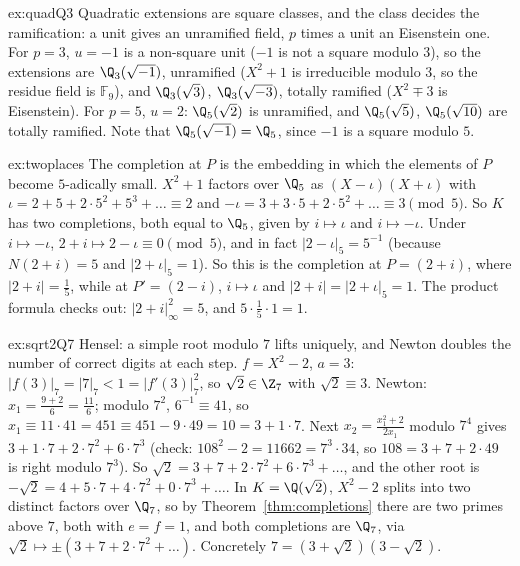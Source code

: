 \begin{solution}{ex:quadQ3}
\idea Quadratic extensions are square classes, and the class decides the ramification: a unit gives an unramified field,
$p$ times a unit an Eisenstein one.
\writeup For $p=3$, $u=-1$ is a non-square unit ($-1$ is not a square modulo $3$), so the extensions are $\Q_3(\sqrt{-1})$,
unramified ($X^2+1$ is irreducible modulo $3$, so the residue field is $\mathbb F_9$), and $\Q_3(\sqrt3)$, $\Q_3(\sqrt{-3})$, totally
ramified ($X^2\mp3$ is Eisenstein). For $p=5$, $u=2$: $\Q_5(\sqrt2)$ is unramified, and $\Q_5(\sqrt5)$, $\Q_5(\sqrt{10})$ are totally
ramified. Note that $\Q_5(\sqrt{-1})=\Q_5$, since $-1$ is a square modulo $5$.
\end{solution}

\begin{solution}{ex:twoplaces}
\idea The completion at $P$ is the embedding in which the elements of $P$ become $5$-adically small.
\writeup $X^2+1$ factors over $\Q_5$ as $(X-\iota)(X+\iota)$ with $\iota=2+5+2\cdot5^2+5^3+\dots\equiv2$ and
$-\iota=3+3\cdot5+2\cdot5^2+\dots\equiv3\pmod5$. So $K$ has two completions, both equal to $\Q_5$, given by $i\mapsto\iota$ and $i\mapsto
-\iota$. Under $i\mapsto-\iota$, $2+i\mapsto2-\iota\equiv0\pmod 5$, and in fact $|2-\iota|_5=5^{-1}$ (because $N(2+i)=5$ and
$|2+\iota|_5=1$). So this is the completion at $P=(2+i)$, where $|2+i|=\frac15$, while at $P'=(2-i)$, $i\mapsto\iota$ and
$|2+i|=|2+\iota|_5=1$. The product formula checks out: $|2+i|_\infty^2=5$, and $5\cdot\frac15\cdot1=1$.
\end{solution}

\begin{solution}{ex:sqrt2Q7}
\idea Hensel: a simple root modulo $7$ lifts uniquely, and Newton doubles the number of correct digits at each step.
\writeup $f=X^2-2$, $a=3$: $|f(3)|_7=|7|_7<1=|f'(3)|_7^2$, so $\sqrt2\in\Z_7$ with $\sqrt2\equiv3$. Newton: $x_1=\frac{9+2}{6}=\frac{11}6$;
modulo $7^2$, $6^{-1}\equiv41$, so $x_1\equiv11\cdot41=451\equiv451-9\cdot49=10=3+1\cdot7$. Next $x_2=\frac{x_1^2+2}{2x_1}$ modulo
$7^4$ gives $3+1\cdot7+2\cdot7^2+6\cdot7^3$ (check: $108^2-2=11662=7^3\cdot34$, so $108=3+7+2\cdot49$ is right modulo $7^3$). So
$\sqrt2=3+7+2\cdot7^2+6\cdot7^3+\dots$, and the other root is $-\sqrt2=4+5\cdot7+4\cdot7^2+0\cdot7^3+\dots$. In $K=\Q(\sqrt2)$,
$X^2-2$ splits into two distinct factors over $\Q_7$, so by Theorem~\ref{thm:completions} there are two primes above $7$, both
with $e=f=1$, and both completions are $\Q_7$, via $\sqrt2\mapsto\pm(3+7+2\cdot7^2+\dots)$. Concretely $7=(3+\sqrt2)(3-\sqrt2)$.
\end{solution}

